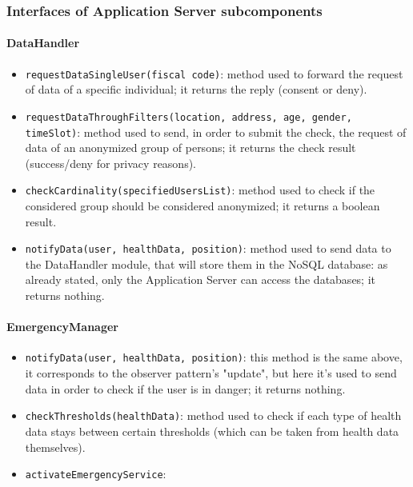 \subsubsection{Interfaces of Application Server subcomponents}
\paragraph{DataHandler}

\begin{itemize}
\item[ ]\texttt{requestDataSingleUser(fiscal code)}: method used to forward the request of data of a specific individual; it returns the reply (consent or deny).

\item[ ]\texttt{requestDataThroughFilters(location, address, age, gender, timeSlot)}: method used to send, in order to submit the check, the request of data of an anonymized group of persons; it returns the check result (success/deny for privacy reasons).

\item[ ]\texttt{checkCardinality(specifiedUsersList)}: method used to check if the considered group should be considered anonymized; it returns a boolean result.

\item[ ]\texttt{notifyData(user, healthData, position)}: method used to send data to the DataHandler module, that will store them in the NoSQL database: as already stated, only the Application Server can access the databases; it returns nothing.
\end{itemize}

\paragraph{EmergencyManager}

\begin{itemize}
\item[ ]\texttt{notifyData(user, healthData, position)}: this method is the same above, it corresponds to the observer pattern's "update", but here it's used to send data in order to check if the user is in danger; it returns nothing.

\item[ ]\texttt{checkThresholds(healthData)}: method used to check if each type of health data stays between certain thresholds (which can be taken from health data themselves).

\item[ ]\texttt{activateEmergencyService}:
\end{itemize}

